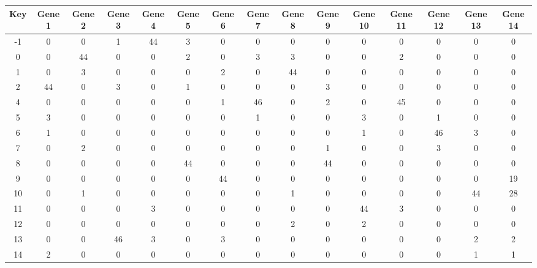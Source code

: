 \begin{tabular}{|c|c|c|c|c|c|c|c|c|c|c|c|c|c|c|}
\hline
Key & Gene 1 & Gene 2 & Gene 3 & Gene 4 & Gene 5 & Gene 6 & Gene 7 & Gene 8 & Gene 9 & Gene 10 & Gene 11 & Gene 12 & Gene 13 & Gene 14 \\
\hline
-1 & 0 & 0 & 1 & 44 & 3 & 0 & 0 & 0 & 0 & 0 & 0 & 0 & 0 & 0 \\
0 & 0 & 44 & 0 & 0 & 2 & 0 & 3 & 3 & 0 & 0 & 2 & 0 & 0 & 0 \\
1 & 0 & 3 & 0 & 0 & 0 & 2 & 0 & 44 & 0 & 0 & 0 & 0 & 0 & 0 \\
2 & 44 & 0 & 3 & 0 & 1 & 0 & 0 & 0 & 3 & 0 & 0 & 0 & 0 & 0 \\
4 & 0 & 0 & 0 & 0 & 0 & 1 & 46 & 0 & 2 & 0 & 45 & 0 & 0 & 0 \\
5 & 3 & 0 & 0 & 0 & 0 & 0 & 1 & 0 & 0 & 3 & 0 & 1 & 0 & 0 \\
6 & 1 & 0 & 0 & 0 & 0 & 0 & 0 & 0 & 0 & 1 & 0 & 46 & 3 & 0 \\
7 & 0 & 2 & 0 & 0 & 0 & 0 & 0 & 0 & 1 & 0 & 0 & 3 & 0 & 0 \\
8 & 0 & 0 & 0 & 0 & 44 & 0 & 0 & 0 & 44 & 0 & 0 & 0 & 0 & 0 \\
9 & 0 & 0 & 0 & 0 & 0 & 44 & 0 & 0 & 0 & 0 & 0 & 0 & 0 & 19 \\
10 & 0 & 1 & 0 & 0 & 0 & 0 & 0 & 1 & 0 & 0 & 0 & 0 & 44 & 28 \\
11 & 0 & 0 & 0 & 3 & 0 & 0 & 0 & 0 & 0 & 44 & 3 & 0 & 0 & 0 \\
12 & 0 & 0 & 0 & 0 & 0 & 0 & 0 & 2 & 0 & 2 & 0 & 0 & 0 & 0 \\
13 & 0 & 0 & 46 & 3 & 0 & 3 & 0 & 0 & 0 & 0 & 0 & 0 & 2 & 2 \\
14 & 2 & 0 & 0 & 0 & 0 & 0 & 0 & 0 & 0 & 0 & 0 & 0 & 1 & 1 \\
\hline
\end{tabular}